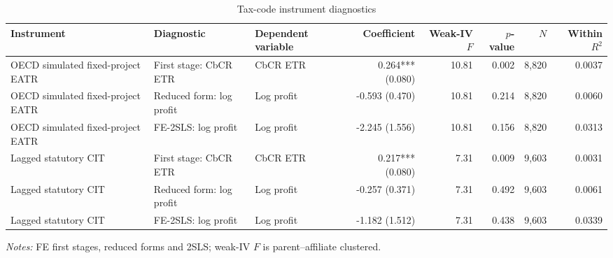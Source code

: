 \begin{table}[H]
\centering
\scriptsize
\setlength{\tabcolsep}{2pt}
\caption[Tax-code instrument diagnostics]{Tax-code instrument diagnostics}
\label{tab:stage3_iv_diagnostics}
\begin{adjustbox}{max width=\textwidth,center}
\begin{tabular}{@{}lllrrrrr@{}}
\toprule
Instrument & Diagnostic & Dependent variable & Coefficient & Weak-IV $F$ & $p$-value & $N$ & Within $R^2$ \\
\midrule
OECD simulated fixed-project EATR & First stage: CbCR ETR & CbCR ETR &  0.264*** (0.080) & 10.81 & 0.002 & 8,820 & 0.0037 \\
OECD simulated fixed-project EATR & Reduced form: log profit & Log profit & -0.593 (0.470) & 10.81 & 0.214 & 8,820 & 0.0060 \\
OECD simulated fixed-project EATR & FE-2SLS: log profit & Log profit & -2.245 (1.556) & 10.81 & 0.156 & 8,820 & 0.0313 \\
Lagged statutory CIT & First stage: CbCR ETR & CbCR ETR &  0.217*** (0.080) &  7.31 & 0.009 & 9,603 & 0.0031 \\
Lagged statutory CIT & Reduced form: log profit & Log profit & -0.257 (0.371) &  7.31 & 0.492 & 9,603 & 0.0061 \\
Lagged statutory CIT & FE-2SLS: log profit & Log profit & -1.182 (1.512) &  7.31 & 0.438 & 9,603 & 0.0339 \\
\bottomrule
\end{tabular}
\end{adjustbox}

\vspace{0.35em}
\noindent\begin{minipage}{\textwidth}
\footnotesize\raggedright\textit{Notes:} FE first stages, reduced forms and 2SLS; weak-IV $F$ is parent--affiliate clustered.
\end{minipage}
\end{table}
